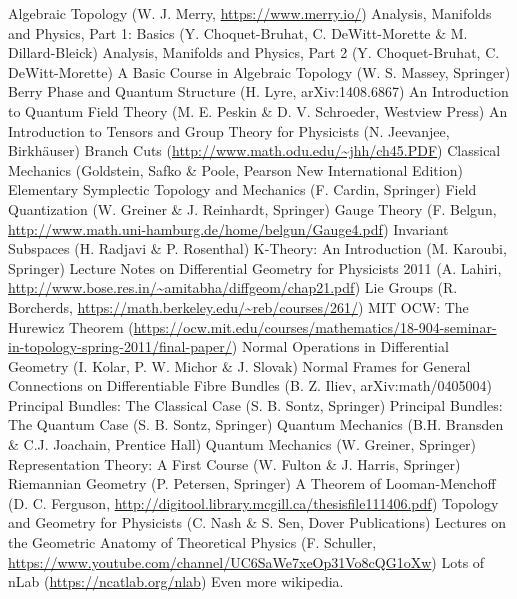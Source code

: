 \documentclass[11pt, a4paper]{report}
\begin{document}
\begin{thebibliography}{99}
	Algebraic Topology (W. J. Merry, \url{https://www.merry.io/})
	Analysis, Manifolds and Physics, Part 1: Basics (Y. Choquet-Bruhat, C. DeWitt-Morette \& M. Dillard-Bleick)
	Analysis, Manifolds and Physics, Part 2 (Y. Choquet-Bruhat, C. DeWitt-Morette)
	A Basic Course in Algebraic Topology (W. S. Massey, Springer)
	Berry Phase and Quantum Structure (H. Lyre, arXiv:1408.6867)
	An Introduction to Quantum Field Theory (M. E. Peskin \& D. V. Schroeder, Westview Press)
    	An Introduction to Tensors and Group Theory for Physicists (N. Jeevanjee, Birkh\"auser)
    	Branch Cuts (\url{http://www.math.odu.edu/~jhh/ch45.PDF})
	Classical Mechanics (Goldstein, Safko \& Poole, Pearson New International Edition)
	Elementary Symplectic Topology and Mechanics (F. Cardin, Springer)
	Field Quantization (W. Greiner \& J. Reinhardt, Springer)
	Gauge Theory (F. Belgun, \url{http://www.math.uni-hamburg.de/home/belgun/Gauge4.pdf})
	Invariant Subspaces (H. Radjavi \& P. Rosenthal)
	K-Theory: An Introduction (M. Karoubi, Springer)
	Lecture Notes on Differential Geometry for Physicists 2011 (A. Lahiri, \url{http://www.bose.res.in/~amitabha/diffgeom/chap21.pdf})
	Lie Groups (R. Borcherds, \url{https://math.berkeley.edu/~reb/courses/261/})
	MIT OCW: The Hurewicz Theorem (\url{https://ocw.mit.edu/courses/mathematics/18-904-seminar-in-topology-spring-2011/final-paper/})
	Normal Operations in Differential Geometry (I. Kolar, P. W. Michor \& J. Slovak)
	Normal Frames for General Connections on Differentiable Fibre Bundles (B. Z. Iliev, arXiv:math/0405004)
	Principal Bundles: The Classical Case (S. B. Sontz, Springer)
	Principal Bundles: The Quantum Case (S. B. Sontz, Springer)
    	Quantum Mechanics (B.H. Bransden \& C.J. Joachain, Prentice Hall)
    	Quantum Mechanics (W. Greiner, Springer)
	Representation Theory: A First Course (W. Fulton \& J. Harris, Springer)
	Riemannian Geometry (P. Petersen, Springer)
	A Theorem of Looman-Menchoff (D. C. Ferguson, \url{http://digitool.library.mcgill.ca/thesisfile111406.pdf})
	Topology and Geometry for Physicists (C. Nash \& S. Sen, Dover Publications)
	Lectures on the Geometric Anatomy of Theoretical Physics (F. Schuller, \url{https://www.youtube.com/channel/UC6SaWe7xeOp31Vo8cQG1oXw})
	Lots of nLab (\url{https://ncatlab.org/nlab})
	Even more wikipedia.
\end{thebibliography}
\printindex
\end{document}
